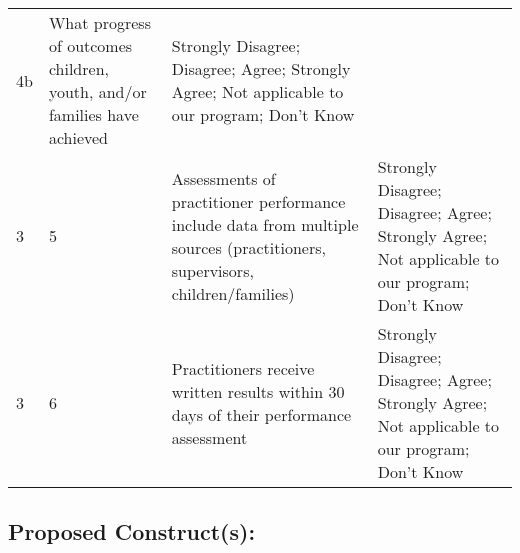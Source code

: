 \documentclass[]{article}
\begin{document}
\begin{longtable}[]{@{}llll@{}}
\begin{minipage}[t]{0.04\columnwidth}
4b\strut
\end{minipage} & \begin{minipage}[t]{0.40\columnwidth}\raggedright\strut
What progress of outcomes children, youth, and/or families have
achieved\strut
\end{minipage} & \begin{minipage}[t]{0.40\columnwidth}\raggedright\strut
Strongly Disagree; Disagree; Agree; Strongly Agree; Not applicable to
our program; Don't Know\strut
\end{minipage}\tabularnewline
\begin{minipage}[t]{0.05\columnwidth}\raggedright\strut
3\strut
\end{minipage} & \begin{minipage}[t]{0.04\columnwidth}\raggedright\strut
5\strut
\end{minipage} & \begin{minipage}[t]{0.40\columnwidth}\raggedright\strut
Assessments of practitioner performance include data from multiple
sources (practitioners, supervisors, children/families)\strut
\end{minipage} & \begin{minipage}[t]{0.40\columnwidth}\raggedright\strut
Strongly Disagree; Disagree; Agree; Strongly Agree; Not applicable to
our program; Don't Know\strut
\end{minipage}\tabularnewline
\begin{minipage}[t]{0.05\columnwidth}\raggedright\strut
3\strut
\end{minipage} & \begin{minipage}[t]{0.04\columnwidth}\raggedright\strut
6\strut
\end{minipage} & \begin{minipage}[t]{0.40\columnwidth}\raggedright\strut
Practitioners receive written results within 30 days of their
performance assessment\strut
\end{minipage} & \begin{minipage}[t]{0.40\columnwidth}\raggedright\strut
Strongly Disagree; Disagree; Agree; Strongly Agree; Not applicable to
our program; Don't Know\strut
\end{minipage}\tabularnewline
\bottomrule
\end{longtable}

\subsection{\texorpdfstring{\textbf{Proposed
Construct(s)}:}{Proposed Construct(s):}}\label{proposed-constructs-2}
\end{document}
